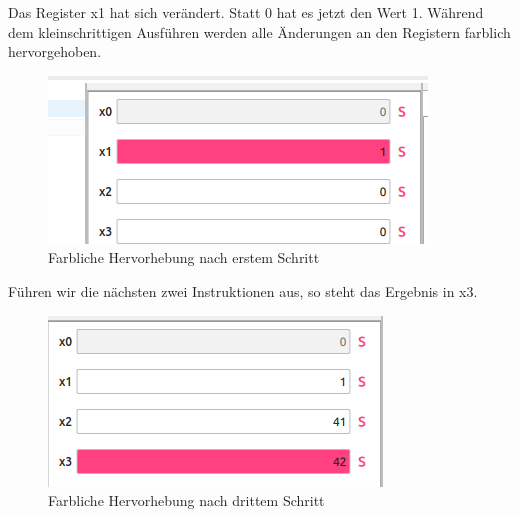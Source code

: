 Das Register x1 hat sich verändert. Statt 0 hat es jetzt den Wert 1. Während dem kleinschrittigen Ausführen werden alle Änderungen an den Registern farblich hervorgehoben.

\begin{figure}[H]
	\centering
	\includegraphics[scale=1.0]{Images/first-steps-4.png}
	\caption{Farbliche Hervorhebung nach erstem Schritt}
\end{figure}

Führen wir die nächsten zwei Instruktionen aus, so steht das Ergebnis in x3.
\begin{figure}[H]
	\centering
	\includegraphics[scale=1.0]{Images/first-steps-5.png}
	\caption{Farbliche Hervorhebung nach drittem Schritt}
\end{figure}

